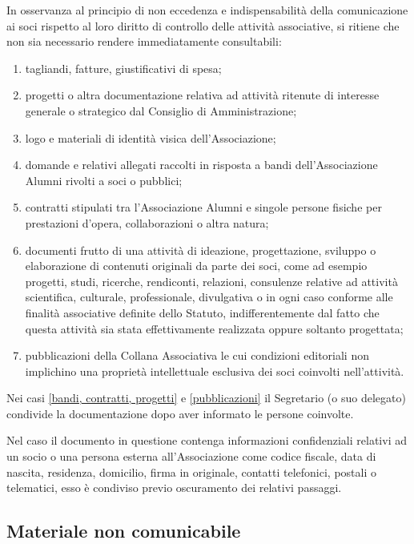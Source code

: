 In osservanza al principio di non eccedenza e indispensabilità della comunicazione ai soci rispetto al loro diritto di controllo delle attività associative, si ritiene che non sia necessario rendere immediatamente consultabili:
\begin{enumerate}
    \item tagliandi, fatture, giustificativi di spesa;
    \item progetti o altra documentazione relativa ad attività ritenute di interesse generale o strategico dal Consiglio di Amministrazione; 
    \item logo e materiali di identità visica dell’Associazione; 
    \item \label{bandi} domande e relativi allegati raccolti in risposta a bandi dell’Associazione Alumni rivolti a soci o pubblici;
    \item \label{contratti} contratti stipulati tra l’Associazione Alumni e singole persone fisiche per prestazioni d’opera, collaborazioni o altra natura; 
    \item \label{progetti} documenti frutto di una attività di ideazione, progettazione, sviluppo o elaborazione di contenuti originali da parte dei soci, come ad esempio progetti, studi, ricerche, rendiconti, relazioni, consulenze relative ad attività scientifica, culturale, professionale, divulgativa o in ogni caso conforme alle finalità associative definite dello Statuto, indifferentemente dal fatto che questa attività sia stata effettivamente realizzata oppure soltanto progettata; 
    \item \label{pubblicazioni} pubblicazioni della Collana Associativa le cui condizioni editoriali non implichino una proprietà intellettuale esclusiva dei soci coinvolti nell’attività.
\end{enumerate}
Nei casi \ref{bandi, contratti, progetti} e \ref{pubblicazioni} il
Segretario (o suo delegato) condivide la documentazione dopo aver informato
le persone coinvolte. 

Nel caso il documento in questione contenga informazioni confidenziali
relativi ad un socio o una persona esterna all’Associazione come codice
fiscale, data di nascita, residenza, domicilio, firma in originale, contatti
telefonici, postali o telematici, esso è condiviso previo oscuramento dei
relativi passaggi.

\subsection{Materiale non comunicabile}\label{materiale-non-comunicabile}

